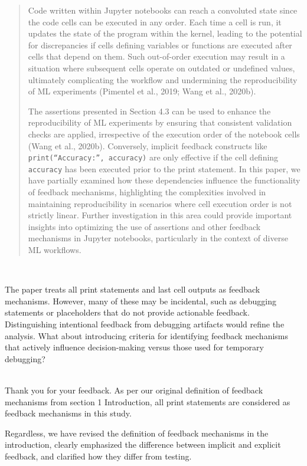 \documentclass[11pt,fleqn]{article}
\newcommand{\eline}{\vspace*{.75\baselineskip}}
\newcommand{\Referee}[1]{\eline \noindent {\bf Reviewer comment #1:} \\}
\newcommand{\Us}{\eline \noindent {\bf Response:}\\}
\newenvironment{revcomment}[1][]
{\Referee{#1}\begin{rcomment}}
{\end{rcomment}}
\begin{document}
\begin{quote}
  Code written within Jupyter notebooks can reach a convoluted state since the code cells can be executed in any order. Each time a cell is run, it updates the state of the program within the kernel, leading to the potential for discrepancies if cells defining variables or functions are executed after cells that depend on them. Such out-of-order execution may result in a situation where subsequent cells operate on outdated or undefined values, ultimately complicating the workflow and undermining the reproducibility of ML experiments (Pimentel et al., 2019; Wang et al., 2020b).

  The assertions presented in Section 4.3 can be used to enhance the reproducibility of ML experiments by ensuring that consistent validation checks are applied, irrespective of the execution order of the notebook cells (Wang et al., 2020b). Conversely, implicit feedback constructs like \texttt{print(``Accuracy:'', accuracy)} are only effective if the cell defining \texttt{accuracy} has been executed prior to the print statement. In this paper, we have partially examined how these dependencies influence the functionality of feedback mechanisms, highlighting the complexities involved in maintaining reproducibility in scenarios where cell execution order is not strictly linear. Further investigation in this area could provide important insights into optimizing the use of assertions and other feedback mechanisms in Jupyter notebooks, particularly in the context of diverse ML workflows.
\end{quote}

\begin{revcomment}[2.8]
  The paper treats all print statements and last cell outputs as feedback mechanisms. However, many of these may be incidental, such as debugging statements or placeholders that do not provide actionable feedback. Distinguishing intentional feedback from debugging artifacts would refine the analysis. What about introducing criteria for identifying feedback mechanisms that actively influence decision-making versus those used for temporary debugging?
\end{revcomment}

\Us Thank you for your feedback. As per our original definition of feedback mechanisms from section 1 Introduction, all print statements are considered as feedback mechanisms in this study.

Regardless, we have revised the definition of feedback mechanisms in the introduction, clearly emphasized the difference between implicit and explicit feedback, and clarified how they differ from testing.
\end{document}
